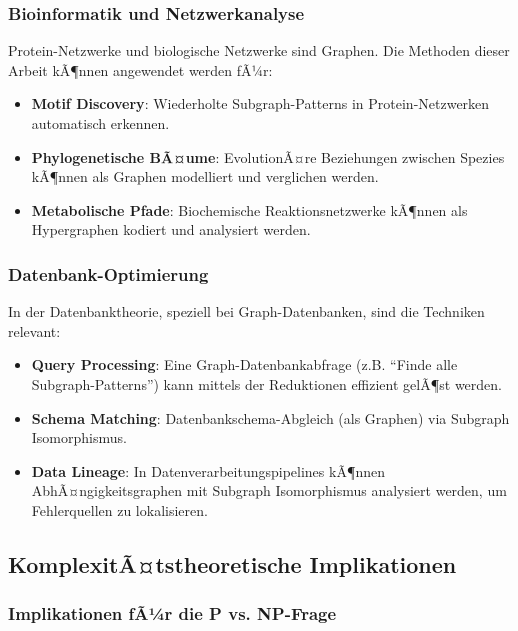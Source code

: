 ﻿\documentclass[a4paper,12pt]{article}
\theoremstyle{definition}
\begin{document}
\subsubsection{Bioinformatik und Netzwerkanalyse}

Protein-Netzwerke und biologische Netzwerke sind Graphen. Die Methoden dieser Arbeit kÃ¶nnen angewendet werden fÃ¼r:

\begin{itemize}
	\item \textbf{Motif Discovery}: Wiederholte Subgraph-Patterns in Protein-Netzwerken automatisch erkennen.
	
	\item \textbf{Phylogenetische BÃ¤ume}: EvolutionÃ¤re Beziehungen zwischen Spezies kÃ¶nnen als Graphen modelliert und verglichen werden.
	
	\item \textbf{Metabolische Pfade}: Biochemische Reaktionsnetzwerke kÃ¶nnen als Hypergraphen kodiert und analysiert werden.
\end{itemize}

\subsubsection{Datenbank-Optimierung}

In der Datenbanktheorie, speziell bei Graph-Datenbanken, sind die Techniken relevant:

\begin{itemize}
	\item \textbf{Query Processing}: Eine Graph-Datenbankabfrage (z.B. ``Finde alle Subgraph-Patterns'') kann mittels der Reduktionen effizient gelÃ¶st werden.
	
	\item \textbf{Schema Matching}: Datenbankschema-Abgleich (als Graphen) via Subgraph Isomorphismus.
	
	\item \textbf{Data Lineage}: In Datenverarbeitungspipelines kÃ¶nnen AbhÃ¤ngigkeitsgraphen mit Subgraph Isomorphismus analysiert werden, um Fehlerquellen zu lokalisieren.
\end{itemize}

\subsection{KomplexitÃ¤tstheoretische Implikationen}

\subsubsection{Implikationen fÃ¼r die P vs. NP-Frage}
\end{document}
